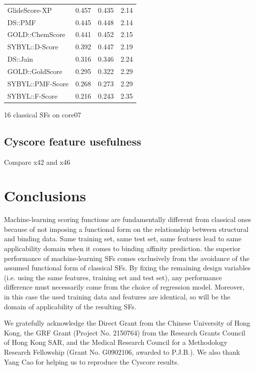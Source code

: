 \documentclass[journal=jacsat,manuscript=article]{achemso}
\begin{document}
\begin{table}
\begin{tabular}{lrrr}
GlideScore-XP & 0.457 & 0.435 & 2.14\\
DS::PMF & 0.445 & 0.448 & 2.14\\
GOLD::ChemScore & 0.441 & 0.452 & 2.15\\
SYBYL::D-Score & 0.392 & 0.447 & 2.19\\
DS::Jain & 0.316 & 0.346 & 2.24\\
GOLD::GoldScore & 0.295 & 0.322 & 2.29\\
SYBYL::PMF-Score & 0.268 & 0.273 & 2.29\\
SYBYL::F-Score & 0.216 & 0.243 & 2.35\\
    \hline
  \end{tabular}
\end{table}

16 classical SFs on core07 \cite{1313}

\subsection{Cyscore feature usefulness}

Compare x42 and x46

\section{Conclusions}

Machine-learning scoring functions are fundamentally different from classical ones because of not imposing a functional form on the relationship between structural and binding data.
Same training set, same test set, same featuers lead to same applicability domain when it comes to binding affinity prediction.
the superior performance of machine-learning SFs comes exclusively from the avoidance of the assumed functional form of classical SFs. By fixing the remaining design variables (i.e. using the same features, training set and test set), any performance difference must necessarily come from the choice of regression model. Moreover, in this case the used training data and features are identical, so will be the domain of applicability of the resulting SFs. 

\begin{acknowledgement}

We gratefully acknowledge the Direct Grant from the Chinese University of Hong Kong, the GRF Grant (Project No. 2150764) from the Research Grants Council of Hong Kong SAR, and the Medical Research Council for a Methodology Research Fellowship (Grant No. G0902106, awarded to P.J.B.). We also thank Yang Cao for helping us to reproduce the Cyscore results.

\end{acknowledgement}
\end{document}
